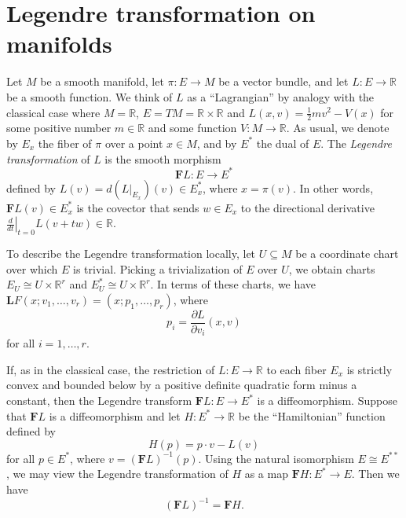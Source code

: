 \documentclass{article}
\providecommand{\R}{\mathbb R}
\providecommand{\F}{\mathbf F}
\begin{document}
\section{Legendre transformation on manifolds}

Let $M$ be a smooth manifold, let $\pi : E\to M$ be a vector bundle, and let $L : E\to \R$ be a smooth function.
We think of $L$ as a ``Lagrangian'' by analogy with the classical case where $M = \R$, $E = TM = \R\times \R$ and $L(x,v) = \frac 1 2 m v^2 - V(x)$ for some positive number $m\in \R$ and some function $V : M \to \R$.
As usual, we denote by $E_x$ the fiber of $\pi$ over a point $x\in M$, and by $E^*$ the dual of $E$.
The \emph{Legendre transformation} of $L$ is the smooth morphism
$$\F L : E \to E^*$$
defined by 
$L(v) = d(L|_{E_x})(v) \in E_x^*$,
where $x = \pi(v)$.
In other words, $\F L(v)\in E_x^*$ is the covector that sends $w\in E_x$ to the directional derivative $\left.\frac d {dt}\right|_{t=0} L(v + tw)\in \R$.

To describe the Legendre transformation locally, let $U\subseteq M$ be a coordinate chart over which $E$ is trivial.
Picking a trivialization of $E$ over $U$, we obtain charts $E_U \cong U \times \R^r$ and $E_U^* \cong U \times \R^r$.
In terms of these charts, we have $\mathbf L F(x; v_1,\dotsc, v_r) = (x; p_1,\dotsc, p_r)$, where
$$p_i = \frac {\partial L}{\partial v_i}(x,v)$$
for all $i=1,\dots, r$.

If, as in the classical case, the restriction of $L : E\to \R$ to each fiber $E_x$ is strictly convex and bounded below by a positive definite quadratic form minus a constant, then the Legendre transform $\F L : E\to E^*$ is a diffeomorphism.
Suppose that $\F L$ is a diffeomorphism and let $H : E^* \to \R$ be the ``Hamiltonian'' function defined by
$$H(p) = p \cdot v - L(v)$$
for all $p\in E^*$, where $v = (\F L)^{-1}(p)$.
Using the natural isomorphism $E\cong E^{**}$, we may view the Legendre transformation of $H$ as a map $\F H : E^* \to E$.
Then we have
$$(\F L)^{-1} = \F H.$$
\end{document}
